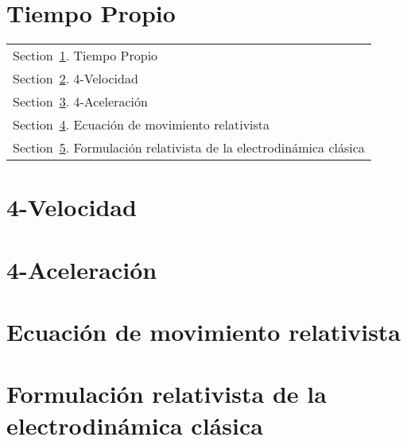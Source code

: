 \documentclass[../main]{subfiles}
\begin{document}
        \section{Tiempo Propio}\label{Sec:TiemPropio}

        \begin{margintable}\vspace{1.4in}\footnotesize
		\begin{tabularx}{\marginparwidth}{|X}
        Section~\ref{Sec:TiemPropio}. Tiempo Propio\\
        Section~\ref{Sec:4-vel}. 4-Velocidad\\
        Section~\ref{Sec:4-acel}. 4-Aceleración\\
        Section~\ref{Sec:MovRel}. Ecuación de movimiento relativista\\
        Section~\ref{Sec:RelElectro}. Formulación relativista de la electrodinámica clásica\\
		\end{tabularx}
        \end{margintable}

        \lipsum[1]

    \begin{adjustwidth}{0pt}{-100pt}

        \section{4-Velocidad}\label{Sec:4-vel}
            \lipsum[1]

        \section{4-Aceleración}\label{Sec:4-acel}
            \lipsum[1]

        \section{Ecuación de movimiento relativista}\label{Sec:MovRel}
            \lipsum[1]

        \section{Formulación relativista de la electrodinámica clásica}\label{Sec:RelElectro}
            \lipsum[1]

    \end{adjustwidth}
\end{document}
